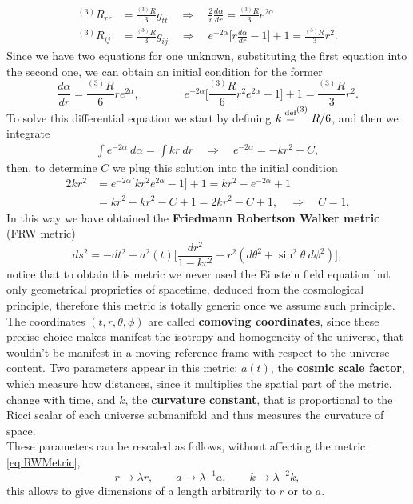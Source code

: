 \begin{align*}
    ^{(3)}R_{rr}&=\frac{^{(3)}R}{3}g_{tt}\quad\Rightarrow\quad\frac{2}{r}\frac{d\alpha}{dr}=\frac{^{(3)}R}{3}e^{2\alpha}\\ ^{(3)}R_{ij}&=\frac{^{(3)}R}{3}g_{ij}\quad\Rightarrow\quad e^{-2\alpha}\bigg[r\frac{d\alpha}{dr}-1\bigg]+1=\frac{^{(3)}R}{3}r^2.
\end{align*}
Since we have two equations for one unknown, substituting the first equation into the second one, we can obtain an initial condition for the former
\begin{equation*}
    \frac{d\alpha}{dr}=\frac{^{(3)}R}{6}re^{2\alpha},\qquad\qquad e^{-2\alpha}\bigg[\frac{^{(3)}R}{6}r^2e^{2\alpha}-1\bigg]+1=\frac{^{(3)}R}{3}r^2.
\end{equation*}
To solve this differential equation we start by defining $k\stackrel{\text{def}}{=}^{(3)}R/6$, and then we integrate
\begin{align*}
    \int e^{-2\alpha}\ d\alpha=\int kr\ dr\quad \Rightarrow\quad e^{-2\alpha}=-kr^2+C,
\end{align*}
then, to determine $C$ we plug this solution into the initial condition
\begin{align*}
    2kr^2&=e^{-2\alpha}\bigg[kr^2e^{2\alpha}-1\bigg]+1=kr^2-e^{-2\alpha}+1\\
       &=kr^2+kr^2-C+1=2kr^2-C+1,\quad \Rightarrow\quad \boxed{C=1}.
\end{align*}    
In this way we have obtained the \textbf{Friedmann Robertson Walker metric} (FRW metric)
\begin{equation}\label{eq:RWMetric}
    ds^2=-dt^2+a^2(t)\bigg[\frac{dr^2}{1-kr^2}+r^2(d\theta^2+\sin^2\theta\ d\phi^2)\bigg],
\end{equation}
notice that to obtain this metric we never used the Einstein field equation but only geometrical proprieties of spacetime, deduced from the cosmological principle, therefore this metric is totally generic once we assume such principle.\\
The coordinates $(t,r,\theta,\phi)$ are called \textbf{comoving coordinates}, since these precise choice makes manifest the isotropy and homogeneity of the universe, that wouldn't be manifest in a moving reference frame with respect to the universe content.
Two parameters appear in this metric:
$a(t)$, the \textbf{cosmic scale factor}, which measure how distances, since it multiplies the spatial part of the metric, change with time, and
$k$, the \textbf{curvature constant}, that is proportional to the Ricci scalar of each universe submanifold and thus measures the curvature of space.\\
These parameters can be rescaled as follows, without affecting the metric \eqref{eq:RWMetric},
\begin{equation*}
    r\rightarrow\lambda r,\qquad a\rightarrow\lambda^{-1} a,\qquad k\rightarrow\lambda^{-2} k,
\end{equation*}
this allows to give dimensions of a length arbitrarily to $r$ or to $a$.

